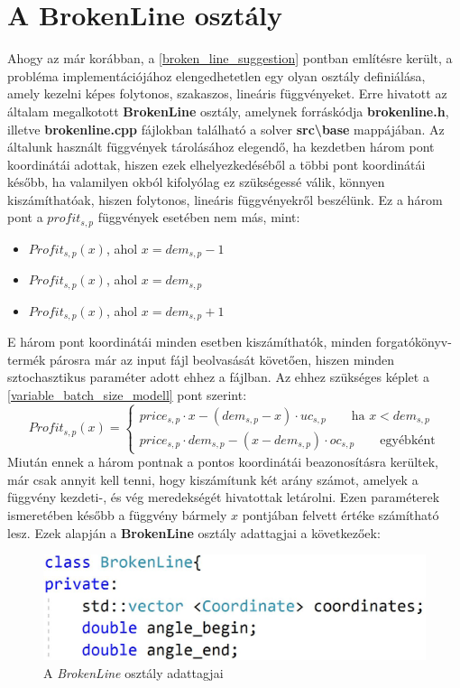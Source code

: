 \section{A BrokenLine osztály} \label{broken_line_class}
Ahogy az már korábban, a \ref{broken_line_suggestion} pontban említésre került, a probléma implementációjához elengedhetetlen egy olyan osztály definiálása, amely kezelni képes folytonos, szakaszos, lineáris függvényeket. Erre hivatott az általam megalkotott \textbf{BrokenLine} osztály, amelynek forráskódja \textbf{brokenline.h}, illetve \textbf{brokenline.cpp} fájlokban található a solver \textbf{src\textbackslash base} mappájában. Az általunk használt függvények tárolásához elegendő, ha kezdetben három pont koordinátái adottak, hiszen ezek elhelyezkedéséből a többi pont koordinátái később, ha valamilyen okból kifolyólag ez szükségessé válik, könnyen kiszámíthatóak, hiszen folytonos, lineáris függvényekről beszélünk. Ez a három pont a $profit_{s,p}$ függvények esetében nem más, mint: 
\begin{itemize}
\item $Profit_{s,p}(x)$\quad, ahol $x=dem_{s,p}-1$
\item $Profit_{s,p}(x)$\quad, ahol $x=dem_{s,p}$
\item $Profit_{s,p}(x)$\quad, ahol $x=dem_{s,p}+1$
\end{itemize} 
E három pont koordinátái minden esetben kiszámíthatók, minden forgatókönyv-termék párosra már az input fájl beolvasását követően, hiszen minden sztochasztikus paraméter adott ehhez a fájlban. Az ehhez szükséges képlet a \ref{variable_batch_size_modell} pont szerint:
\begin{equation*}
Profit_{s,p}(x)= \begin{cases}
            price_{s,p}\cdot x-(dem_{s,p}-x) \cdot uc_{s,p}\qquad \text{ha } x<dem_{s,p} \\
            price_{s,p} \cdot dem_{s,p}-(x-dem_{s,p}) \cdot oc_{s,p}\qquad \text{egyébként}
       \end{cases}
\end{equation*}
Miután ennek a három pontnak a pontos koordinátái beazonosításra kerültek, már csak annyit kell tenni, hogy kiszámítunk két arány számot, amelyek a függvény kezdeti-, és vég meredekségét hivatottak letárolni. Ezen paraméterek ismeretében később a függvény bármely $x$ pontjában felvett értéke számítható lesz. Ezek alapján a \textbf{BrokenLine} osztály adattagjai a következőek:
\begin{figure}[H]
\begin{center}
\includegraphics[scale=0.5]{broken_line_variables}
\caption{A \textit{BrokenLine} osztály adattagjai}
\label{broken_line_variables}
\end{center}
\end{figure} 
